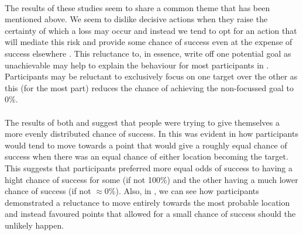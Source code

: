 \documentclass[12pt]{article}
\begin{document}
\paragraph{} The results of these studies seem to share a common theme that has been mentioned above. We seem to dislike decisive actions when they raise the certainty of which a loss may occur \citep{KahnemanProspect} and instead we tend to opt for an action that will mediate this risk and provide some chance of success even at the expense of success elsewhere \citep{Koehler2010,Hudson2007probmove}. This reluctance to, in essence, write off one potential goal as unachievable may help to explain the behaviour for most participants in \cite{clarke2015failure}. Participants may be reluctant to exclusively focus on one target over the other as this (for the most part) reduces the chance of achieving the non-focussed goal to $0\%$.

\paragraph{} The results of both \cite{CHAPMAN2010168} and \cite{Hudson2007probmove} suggest that people were trying to give themselves a more evenly distributed chance of success. In \cite{CHAPMAN2010168} this was evident in how participants would tend to move towards a point that would give a roughly equal chance of success when there was an equal chance of either location becoming the target. This suggests that participants preferred more equal odds of success to having a hight chance of success for some (if not 100\%) and the other having a much lower chance of success (if not $\approx$0\%). Also, in \cite{Hudson2007probmove}, we can see how participants demonstrated a reluctance to move entirely towards the most probable location and instead favoured points that allowed for a small chance of success should the unlikely happen.


\end{document}
